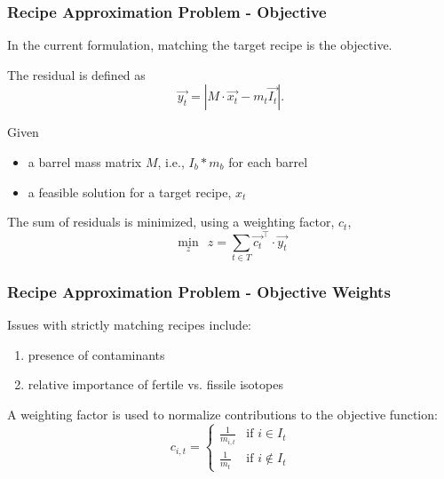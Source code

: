 \begin{frame}[ctb!]
  \frametitle{Recipe Approximation Problem - Objective}

  In the current formulation, matching the target recipe is the objective.
  
  The residual is defined as
  \begin{equation}\label{eqs:residual}
    \vec{y_{t}} = \left| M \cdot \vec{x_{t}}  - m_t \vec{I_{t}} \right|.
  \end{equation}

  Given
  \begin{itemize}
    \item a barrel mass matrix $M$, i.e., $I_b * m_b$ for each barrel
    \item a feasible solution for a target recipe, $x_t$
  \end{itemize}

  The sum of residuals is minimized, using a weighting factor, $c_t$,
  \begin{equation}\label{rap-obj}
    \min_{z} \:\: z = \sum_{t \in T} \vec{c_{t}}^{\top} \cdot \vec{y_{t}}
  \end{equation}
\end{frame}

\begin{frame}[ctb!]
  \frametitle{Recipe Approximation Problem - Objective Weights}

  Issues with strictly matching recipes include:
  \begin{enumerate}
    \item presence of contaminants
    \item relative importance of fertile vs. fissile isotopes
  \end{enumerate}

  \vspace{0.2cm}

  A weighting factor is used to normalize contributions to the objective
  function:
  \begin{equation}\label{eqs:weights}
    c_{i,t} = 
    \begin{cases}
      \frac{1}{m_{i,t}} & \text{if } i \in I_{t} \\
      \frac{1}{m_{t}}   & \text{if } i \not\in I_{t}
    \end{cases}
  \end{equation}  
\end{frame}

